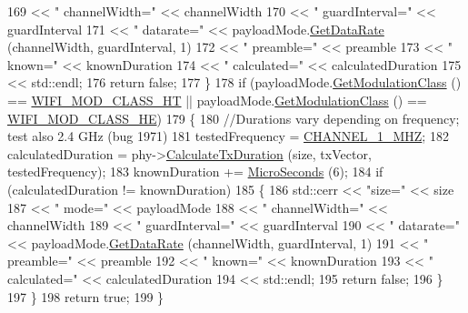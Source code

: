 \begin{DoxyCode}
169                 << \textcolor{stringliteral}{" channelWidth="} << channelWidth
170                 << \textcolor{stringliteral}{" guardInterval="} << guardInterval
171                 << \textcolor{stringliteral}{" datarate="} << payloadMode.\hyperlink{classns3_1_1WifiMode_adcfbe150f69da720db23387f733b8a52}{GetDataRate} (channelWidth, guardInterval, 1)
172                 << \textcolor{stringliteral}{" preamble="} << preamble
173                 << \textcolor{stringliteral}{" known="} << knownDuration
174                 << \textcolor{stringliteral}{" calculated="} << calculatedDuration
175                 << std::endl;
176       \textcolor{keywordflow}{return} \textcolor{keyword}{false};
177     \}
178   \textcolor{keywordflow}{if} (payloadMode.\hyperlink{classns3_1_1WifiMode_a7941cd2a0bc8d2ba68ba6a12c7e2c42a}{GetModulationClass} () == \hyperlink{namespacens3_aa999e1221606a2b21b1eb33c2007c217a6ac45cac36cc4454649435d24ebf349c}{WIFI\_MOD\_CLASS\_HT} || 
      payloadMode.\hyperlink{classns3_1_1WifiMode_a7941cd2a0bc8d2ba68ba6a12c7e2c42a}{GetModulationClass} () == \hyperlink{namespacens3_aa999e1221606a2b21b1eb33c2007c217abfa4f7272510045a9b43e8ac27ac13b0}{WIFI\_MOD\_CLASS\_HE})
179     \{
180       \textcolor{comment}{//Durations vary depending on frequency; test also 2.4 GHz (bug 1971)}
181       testedFrequency = \hyperlink{tx-duration-test_8cc_a236e95d73454722c31846ac6fcd3e497}{CHANNEL\_1\_MHZ};
182       calculatedDuration = phy->\hyperlink{classns3_1_1WifiPhy_aee98c7241bb4f0bb8e6d90f5771dacc7}{CalculateTxDuration} (size, txVector, testedFrequency);
183       knownDuration += \hyperlink{group__timecivil_ga17465a639c8d1464e76538afdd78a9f0}{MicroSeconds} (6);
184       \textcolor{keywordflow}{if} (calculatedDuration != knownDuration)
185         \{
186           std::cerr << \textcolor{stringliteral}{"size="} << size
187                     << \textcolor{stringliteral}{" mode="} << payloadMode
188                     << \textcolor{stringliteral}{" channelWidth="} << channelWidth
189                     << \textcolor{stringliteral}{" guardInterval="} << guardInterval
190                     << \textcolor{stringliteral}{" datarate="} << payloadMode.\hyperlink{classns3_1_1WifiMode_adcfbe150f69da720db23387f733b8a52}{GetDataRate} (channelWidth, guardInterval, 1)
191                     << \textcolor{stringliteral}{" preamble="} << preamble
192                     << \textcolor{stringliteral}{" known="} << knownDuration
193                     << \textcolor{stringliteral}{" calculated="} << calculatedDuration
194                     << std::endl;
195           \textcolor{keywordflow}{return} \textcolor{keyword}{false};
196         \}
197     \}
198   \textcolor{keywordflow}{return} \textcolor{keyword}{true};
199 \}
\end{DoxyCode}


